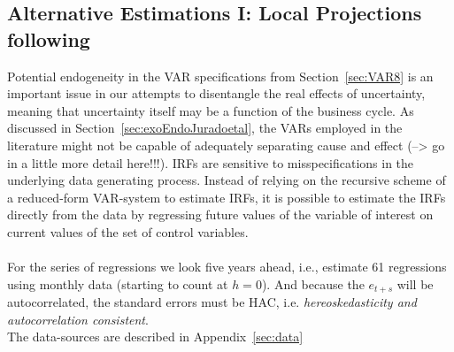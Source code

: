 \documentclass[a4paper,11pt,listof=nochaptergap,oneside,pointednumbers,bibtotoc,bigheadings,liststotoc]{scrbook}
\theoremstyle{mysatz}
\theoremstyle{mydefinition}
\theoremstyle{mybemerkung}
\begin{document}
\begin{itemize}
\section{Alternative Estimations I: Local Projections following \citet{jorda:05}}
\label{sec:jorda05}

Potential endogeneity in the VAR specifications from Section~\ref{sec:VAR8} is an important issue in our attempts to disentangle the real effects of uncertainty, meaning that uncertainty itself may be a function of the business cycle. As discussed in Section~\ref{sec:exoEndoJuradoetal}, the VARs employed in the literature might not be capable of adequately separating cause and effect (--> go in a little more detail here!!!). IRFs are sensitive to misspecifications in the underlying data generating process. Instead of relying on the recursive scheme of a reduced-form VAR-system to estimate IRFs, it is possible to estimate the IRFs directly from the data by regressing future values of the variable of interest on current values of the set of control variables. \\
\\
For the series of regressions we look five years ahead, i.e., estimate 61 regressions using monthly data (starting to count at $h=0$). And because the $e_{t+s}$ will be autocorrelated, the standard errors must be HAC, i.e. \textit{hereoskedasticity and autocorrelation consistent}.\\
The data-sources are described in Appendix~\ref{sec:data}




\end{itemize}
\end{document}
